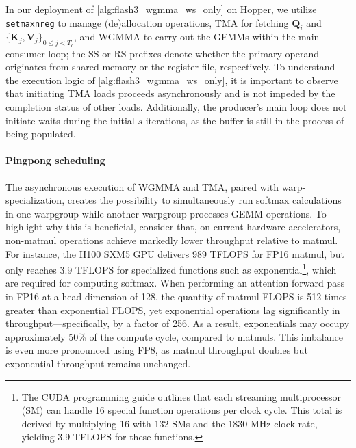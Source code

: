 \begin{enumerate}
In our deployment of \cref{alg:flash3_wgmma_ws_only} on Hopper, we utilize \verb|setmaxnreg| to manage (de)allocation operations, TMA for fetching $\mathbf{Q}_i$ and $\{ \mathbf{K}_j, \mathbf{V}_j \}_{0 \leq j < T_c}$, and WGMMA to carry out the GEMMs within the main consumer loop; the SS or RS prefixes denote whether the primary operand originates from shared memory or the register file, respectively. To understand the execution logic of \cref{alg:flash3_wgmma_ws_only}, it is important to observe that initiating TMA loads proceeds asynchronously and is not impeded by the completion status of other loads. Additionally, the producer's main loop does not initiate waits during the initial $s$ iterations, as the buffer is still in the process of being populated.

\paragraph{Pingpong scheduling} The asynchronous execution of WGMMA and TMA, paired with warp-specialization, creates the possibility to simultaneously run softmax calculations in one warpgroup while another warpgroup processes GEMM operations. To highlight why this is beneficial, consider that, on current hardware accelerators, non-matmul operations achieve markedly lower throughput relative to matmul. For instance, the H100 SXM5 GPU delivers 989 TFLOPS for FP16 matmul, but only reaches 3.9 TFLOPS for specialized functions such as exponential\footnote{The CUDA programming guide outlines that each streaming multiprocessor (SM) can handle 16 special function operations per clock cycle. This total is derived by multiplying 16 with 132 SMs and the 1830 MHz clock rate, yielding 3.9 TFLOPS for these functions.}, which are required for computing softmax. When performing an attention forward pass in FP16 at a head dimension of 128, the quantity of matmul FLOPS is 512 times greater than exponential FLOPS, yet exponential operations lag significantly in throughput—specifically, by a factor of 256. As a result, exponentials may occupy approximately 50\% of the compute cycle, compared to matmuls. This imbalance is even more pronounced using FP8, as matmul throughput doubles but exponential throughput remains unchanged.


\end{enumerate}
